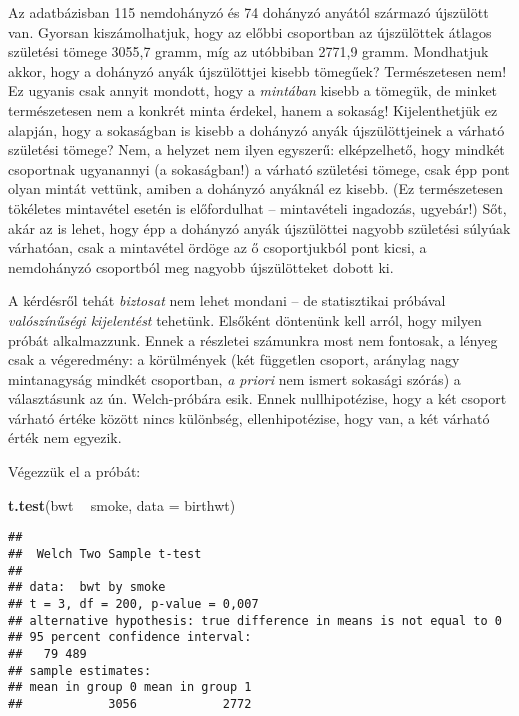 \documentclass[]{book}
\newenvironment{Shaded}{\begin{snugshade}}{\end{snugshade}}
\newcommand{\KeywordTok}[1]{\textcolor[rgb]{0.13,0.29,0.53}{\textbf{#1}}}
\newcommand{\DataTypeTok}[1]{\textcolor[rgb]{0.13,0.29,0.53}{#1}}
\newcommand{\StringTok}[1]{\textcolor[rgb]{0.31,0.60,0.02}{#1}}
\newcommand{\OperatorTok}[1]{\textcolor[rgb]{0.81,0.36,0.00}{\textbf{#1}}}
\newcommand{\NormalTok}[1]{#1}
\begin{document}
Az adatbázisban 115 nemdohányzó és 74 dohányzó anyától származó
újszülött van. Gyorsan kiszámolhatjuk, hogy az előbbi csoportban az
újszülöttek átlagos születési tömege 3055,7 gramm, míg az utóbbiban
2771,9 gramm. Mondhatjuk akkor, hogy a dohányzó anyák újszülöttjei
kisebb tömegűek? Természetesen nem! Ez ugyanis csak annyit mondott, hogy
a \emph{mintában} kisebb a tömegük, de minket természetesen nem a
konkrét minta érdekel, hanem a sokaság! Kijelenthetjük ez alapján, hogy
a sokaságban is kisebb a dohányzó anyák újszülöttjeinek a várható
születési tömege? Nem, a helyzet nem ilyen egyszerű: elképzelhető, hogy
mindkét csoportnak ugyanannyi (a sokaságban!) a várható születési
tömege, csak épp pont olyan mintát vettünk, amiben a dohányzó anyáknál
ez kisebb. (Ez természetesen tökéletes mintavétel esetén is előfordulhat
-- mintavételi ingadozás, ugyebár!) Sőt, akár az is lehet, hogy épp a
dohányzó anyák újszülöttei nagyobb születési súlyúak várhatóan, csak a
mintavétel ördöge az ő csoportjukból pont kicsi, a nemdohányzó
csoportból meg nagyobb újszülötteket dobott ki.

A kérdésről tehát \emph{biztosat} nem lehet mondani -- de statisztikai
próbával \emph{valószínűségi kijelentést} tehetünk. Elsőként döntenünk
kell arról, hogy milyen próbát alkalmazzunk. Ennek a részletei számunkra
most nem fontosak, a lényeg csak a végeredmény: a körülmények (két
független csoport, aránylag nagy mintanagyság mindkét csoportban,
\emph{a priori} nem ismert sokasági szórás) a választásunk az ún.
Welch-próbára esik. Ennek nullhipotézise, hogy a két csoport várható
értéke között nincs különbség, ellenhipotézise, hogy van, a két várható
érték nem egyezik.

Végezzük el a próbát:

\begin{Shaded}
\begin{Highlighting}[]
\KeywordTok{t.test}\NormalTok{(bwt }\OperatorTok{~}\StringTok{ }\NormalTok{smoke, }\DataTypeTok{data =}\NormalTok{ birthwt)}
\end{Highlighting}
\end{Shaded}

\begin{verbatim}
## 
##  Welch Two Sample t-test
## 
## data:  bwt by smoke
## t = 3, df = 200, p-value = 0,007
## alternative hypothesis: true difference in means is not equal to 0
## 95 percent confidence interval:
##   79 489
## sample estimates:
## mean in group 0 mean in group 1 
##            3056            2772
\end{verbatim}
\end{document}

